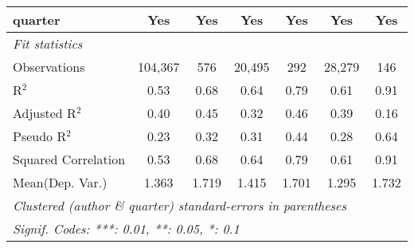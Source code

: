 \begin{tabular}{lcccccc}
   quarter                                                    & Yes           & Yes           & Yes           & Yes           & Yes           & Yes\\  
   \midrule
   \emph{Fit statistics}\\
   Observations                                               & 104,367       & 576           & 20,495        & 292           & 28,279        & 146\\  
   R$^2$                                                      & 0.53          & 0.68          & 0.64          & 0.79          & 0.61          & 0.91\\  
   Adjusted R$^2$                                             & 0.40          & 0.45          & 0.32          & 0.46          & 0.39          & 0.16\\  
   Pseudo R$^2$                                               & 0.23          & 0.32          & 0.31          & 0.44          & 0.28          & 0.64\\  
   Squared Correlation                                        & 0.53          & 0.68          & 0.64          & 0.79          & 0.61          & 0.91\\  
Mean(Dep. Var.) & 1.363 & 1.719 & 1.415 & 1.701 & 1.295 & 1.732 \\
   \midrule \midrule
   \multicolumn{7}{l}{\emph{Clustered (author \& quarter) standard-errors in parentheses}}\\
   \multicolumn{7}{l}{\emph{Signif. Codes: ***: 0.01, **: 0.05, *: 0.1}}\\
\end{tabular}
\par\endgroup
